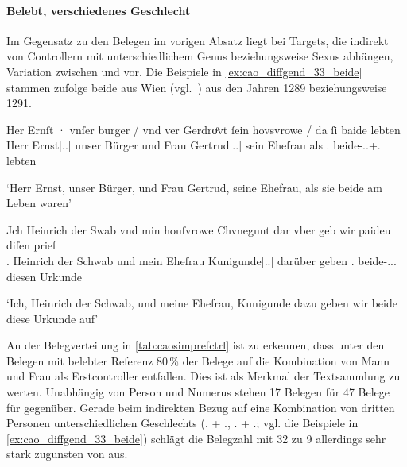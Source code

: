 \paragraph{Belebt, verschiedenes Geschlecht}

Im Gegensatz zu den Belegen im vorigen Absatz liegt bei Targets, die indirekt
von Controllern mit unterschiedlichem Genus beziehungsweise Sexus abhängen,
Variation zwischen  und  vor. Die Beispiele in
\cref{ex:cao_diffgend_33_beide} stammen \citet{cao-online} zufolge beide aus
Wien (vgl.~) aus den Jahren 1289 beziehungsweise 1291.

\begin{exe}
\ex \label{ex:cao_diffgend_33_beide}
	\begin{xlist}
	\ex \label{ex:cao_diffgend_33_beide_1}
		\gll Her Ernſt · vnſer burger / vnd ver Gerdroͤvt ſein
			hovsvrowe / da ſi baide lebten \\
			Herr Ernst[\Nom.\Sg.\MascM] {} unser Bürger {} und Frau
			Gertrud[\Nom.\Sg.\FemF] sein Ehefrau {} als \Tpl\subMF.\Nom{}
			beide-\Nom.\Pl.\M+\F\subMF.\St{} lebten \\
		\begin{taggedline}{\parencites(Wien, 1289)[\pno~1073, 374.40--41]{cao2}}
		\trans `Herr Ernst, unser Bürger, und Frau Gertrud, seine Ehefrau,
			als sie beide am Leben waren'
		\end{taggedline}

	\ex \label{ex:cao_diffgend_33_beide_2}
		\gll Jch Heinrich der Swab vnd min houſvrowe Chvnegunt
			\textelp{} {dar vber} geb wir paideu diſen
			prief \\
			\Fsg\subM.\Nom{} Heinrich der Schwab und mein Ehefrau
			Kunigunde[\Nom.\Sg.\FemF] {} darüber geben \Fpl\subMF.\Nom{}
			beide-\Nom.\Pl.\N\subMF.\St{} diesen Urkunde \\
		\begin{taggedline}{\parencites(Wien, 1291)[\pno~N~475, 342.19, 28]{cao5}}
		\trans `Ich, Heinrich der Schwab, und meine Ehefrau, Kunigunde
			\textelp{} dazu geben wir beide diese Urkunde auf'
		\end{taggedline}
	\end{xlist}
\end{exe}

An der Belegverteilung in \cref{tab:caosimprefctrl} ist zu erkennen, dass unter
den Belegen mit belebter Referenz 80\,\% der Belege auf die Kombination von
Mann und Frau als Erstcontroller entfallen. Dies ist als Merkmal der
Textsammlung zu werten. Unabhängig von Person und Numerus stehen 17 Belegen für
 47 Belege für  gegenüber. Gerade beim
indirekten Bezug auf eine Kombination von dritten Personen unterschiedlichen
Geschlechts (\Tsg.\MascM{} + \Tsg.\FemF, \Tsg.\FemF{} + \Tsg.\MascM; vgl. die
Beispiele in \cref{ex:cao_diffgend_33_beide}) schlägt die Belegzahl mit 32 zu 9
allerdings sehr stark zugunsten von  aus.


